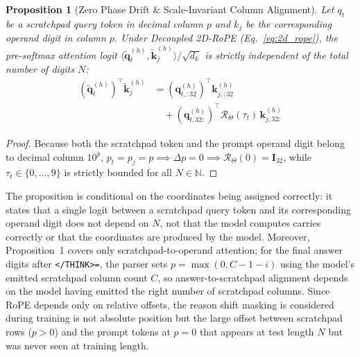 \documentclass[10pt,twocolumn]{article}
\newtheorem{proposition}{Proposition}
\begin{document}
\begin{proposition}[Zero Phase Drift \& Scale-Invariant Column Alignment]
Let $q_t$ be a scratchpad query token in decimal column $p$ and $k_j$ be the corresponding operand digit in column $p$. Under Decoupled 2D-RoPE (Eq.~\ref{eq:2d_rope}), the pre-softmax attention logit $\langle \tilde{\mathbf{q}}_t^{(h)}, \tilde{\mathbf{k}}_j^{(h)} \rangle / \sqrt{d_k}$ is strictly independent of the total number of digits $N$:
\begin{equation}
\begin{aligned}
\left(\tilde{\mathbf{q}}_t^{(h)}\right)^\top \tilde{\mathbf{k}}_j^{(h)} &= \left(\mathbf{q}_{t, :32}^{(h)}\right)^\top \mathbf{k}_{j, :32}^{(h)} \\
&\quad + \left(\mathbf{q}_{t, 32:}^{(h)}\right)^\top \mathcal{R}_{\Theta}(\tau_t)\, \mathbf{k}_{j, 32:}^{(h)}
\end{aligned}
\end{equation}
\end{proposition}
\begin{proof}
Because both the scratchpad token and the prompt operand digit belong to decimal column $10^p$, $p_t = p_j = p \implies \Delta p = 0 \implies \mathcal{R}_{\Theta}(0) = \mathbf{I}_{32}$, while $\tau_t \in \{0, \dots, 9\}$ is strictly bounded for all $N \in \mathbb{N}$.
\end{proof}
\noindent The proposition is conditional on the coordinates being assigned correctly: it states that a single logit between a scratchpad query token and its corresponding operand digit does not depend on $N$, not that the model computes carries correctly or that the coordinates are produced by the model. Moreover, Proposition~1 covers only scratchpad-to-operand attention; for the final answer digits after \texttt{</THINK>=}, the parser sets $p = \max(0, C - 1 - i)$ using the model's emitted scratchpad column count $C$, so answer-to-scratchpad alignment depends on the model having emitted the right number of scratchpad columns. Since RoPE depends only on relative offsets, the reason shift masking is considered during training is not absolute position but the large offset between scratchpad rows ($p>0$) and the prompt tokens at $p=0$ that appears at test length $N$ but was never seen at training length.
\end{document}
